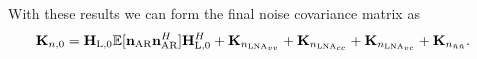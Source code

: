 With these results we can form the final noise covariance matrix as 
\begin{align}
\label{eq:noise_cov}
\mat{K}_{n,0}&= %
\mat{H}_\text{L,0}\mathbb{E}[\vec{n}_\text{AR}\vec{n}_\text{AR}^H]\mat{H}_\text{L,0}^H +
\mat{K}_{n_{\text{LNA}_{vv}}}+
\mat{K}_{n_{\text{LNA}_{cc}}}+
\mat{K}_{n_{\text{LNA}_{vc}}}+
\mat{K}_{n_{\tilde{n}\tilde{n}}}.
\end{align}









